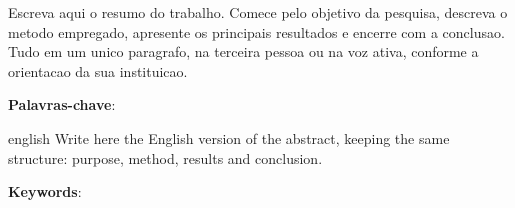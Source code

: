 %
%

\begin{resumo}
  Escreva aqui o resumo do trabalho. Comece pelo objetivo da pesquisa,
  descreva o metodo empregado, apresente os principais resultados e
  encerre com a conclusao. Tudo em um unico paragrafo, na terceira
  pessoa ou na voz ativa, conforme a orientacao da sua instituicao.

  \vspace{\onelineskip}
  \noindent
  \textbf{Palavras-chave}: \lkKeywords
\end{resumo}

\begin{resumo}[Abstract]
  \begin{otherlanguage*}{english}
    Write here the English version of the abstract, keeping the same
    structure: purpose, method, results and conclusion.

    \vspace{\onelineskip}
    \noindent
    \textbf{Keywords}: \lkKeywordsEn
  \end{otherlanguage*}
\end{resumo}
